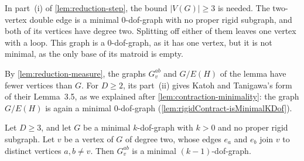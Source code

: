 In part~(i) of \cref{lem:reduction-step}, the bound $|V(G)| \ge 3$ is
needed. The two-vertex double edge is a minimal $0$-dof-graph with no
proper rigid subgraph, and both of its vertices have degree two.
Splitting off either of them leaves one vertex with a loop. This graph
is a $0$-dof-graph, as it has one vertex, but it is not minimal, as the
only base of its matroid is empty.

By \cref{lem:reduction-measure}, the graphs $G_v^{ab}$ and $G/E(H)$ of
the lemma have fewer vertices than $G$. For $D \ge 2$, its part~(ii)
gives Katoh and Tanigawa's form of their Lemma~3.5, as we explained
after \cref{lem:contraction-minimality}: the graph $G/E(H)$ is again a
minimal $0$-dof-graph (\cref{lem:rigidContract-isMinimalKDof}).

\begin{lemma}
  \label{lem:reduction-step-pos}
  \leanok
  Let $D \ge 3$, and let $G$ be a minimal $k$-dof-graph with $k > 0$ and
  no proper rigid subgraph. Let $v$ be a vertex of $G$ of degree two,
  whose edges $e_a$ and $e_b$ join $v$ to distinct vertices
  $a, b \neq v$. Then $G_v^{ab}$ is a minimal $(k-1)$-dof-graph.
\end{lemma}
